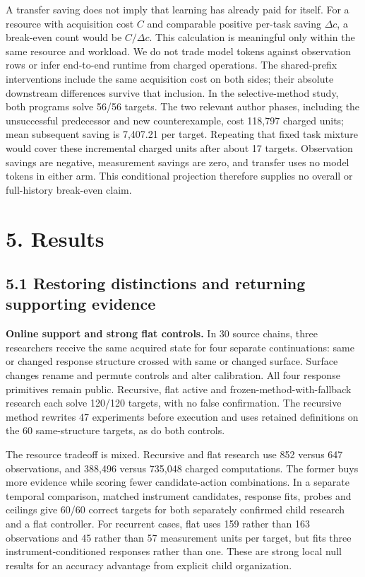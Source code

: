 \documentclass[twoside,11pt]{article}
\begin{document}
A transfer saving does not imply that learning has already paid for itself. For a resource with acquisition cost \(C\) and comparable positive per-task saving \(\Delta c\), a break-even count would be \(C/\Delta c\). This calculation is meaningful only within the same resource and workload. We do not trade model tokens against observation rows or infer end-to-end runtime from charged operations. The shared-prefix interventions include the same acquisition cost on both sides; their absolute downstream differences survive that inclusion. In the selective-method study, both programs solve 56/56 targets. The two relevant author phases, including the unsuccessful predecessor and new counterexample, cost 118,797 charged units; mean subsequent saving is 7,407.21 per target. Repeating that fixed task mixture would cover these incremental charged units after about 17 targets. Observation savings are negative, measurement savings are zero, and transfer uses no model tokens in either arm. This conditional projection therefore supplies no overall or full-history break-even claim.


\section*{5. Results}

\subsection*{5.1 Restoring distinctions and returning supporting evidence}

\textbf{Online support and strong flat controls.} In 30 source chains, three researchers receive the same acquired state for four separate continuations: same or changed response structure crossed with same or changed surface. Surface changes rename and permute controls and alter calibration. All four response primitives remain public. Recursive, flat active and frozen-method-with-fallback research each solve 120/120 targets, with no false confirmation. The recursive method rewrites 47 experiments before execution and uses retained definitions on the 60 same-structure targets, as do both controls.


The resource tradeoff is mixed. Recursive and flat research use 852 versus 647 observations, and 388,496 versus 735,048 charged computations. The former buys more evidence while scoring fewer candidate-action combinations. In a separate temporal comparison, matched instrument candidates, response fits, probes and ceilings give 60/60 correct targets for both separately confirmed child research and a flat controller. For recurrent cases, flat uses 159 rather than 163 observations and 45 rather than 57 measurement units per target, but fits three instrument-conditioned responses rather than one. These are strong local null results for an accuracy advantage from explicit child organization.
\end{document}
